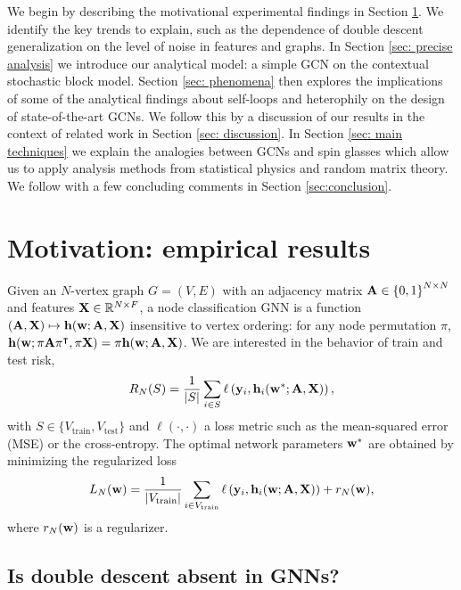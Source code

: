 \documentclass[9pt,twocolumn]{pnas-new}
\def\?#1{}
\begin{document}
We begin by describing the motivational experimental findings in Section \ref{sec: motivation}. We identify the key trends to explain, such as the dependence of double descent generalization on the level of noise in features and graphs. In Section \ref{sec: precise analysis} we introduce our analytical model: a simple GCN on the contextual stochastic block model. Section \ref{sec: phenomena} then explores the implications of some of the analytical findings about self-loops and heterophily on the design of state-of-the-art GCNs. We follow this by a discussion of our results in the context of related work in Section \ref{sec: discussion}. In Section \ref{sec: main techniques} we explain the analogies between GCNs and spin glasses which allow us to apply analysis methods from statistical physics and random matrix theory. We follow with a few concluding comments in Section \ref{sec:conclusion}.


\section{Motivation: empirical results}\label{sec: motivation}

Given an $N$-vertex graph $G = (V, E)$ with an adjacency matrix $\mathbf{A} \in \left\{0, 1\right\}^{N \times N}$ and features $\mathbf{X} \in \mathbb{R}^{N \times F}$, a node classification GNN is a function $( \mathbf{A},\mathbf{X}) \mapsto \mathbf{h}({\mathbf{w}}; \mathbf{A},\mathbf{X})$ insensitive to vertex ordering: for any node permutation $\pi$, $\mathbf{h}({\mathbf{w}}; \pi \mathbf{A} \pi^\intercal,\pi \mathbf{X}) = \pi \mathbf{h}({\mathbf{w}}; \mathbf{A},\mathbf{X})$. We are interested in the behavior of train and test risk,  
\begin{equation}\label{eqn: risk_N}
    R_N(S)=\frac{1}{|S|} \sum_{i\in S} \ell\left(\mathbf{y}_i, \mathbf{h}_{i}(\mathbf{w}^*;\mathbf{A},\mathbf{X})\right),
\end{equation}
with $S \in \{V_\text{train}, V_\text{test}\}$ and $\ell(\cdot,\cdot)$ a loss metric such as the mean-squared error (MSE) or the cross-entropy. The optimal network parameters $\mathbf{w}^*$ are obtained by minimizing the regularized loss 
\begin{equation}\label{eqn: loss_N}
L_N(\mathbf{w})= \frac{1}{|V_{\text{train}}|} \sum_{i\in V_{\text{train}}}  
\ell\left(\mathbf{y}_i, 
    \mathbf{h}_{i}(\mathbf{w};\mathbf{A},\mathbf{X}) \right) + r_N(\mathbf{w}),
\end{equation}
where $r_N(\mathbf{w})$ is a regularizer. 

\subsection*{Is double descent absent in GNNs?\?}
\end{document}
